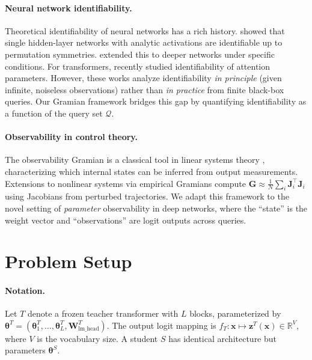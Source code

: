 \documentclass{article}
\newcommand{\R}{\mathbb{R}}
\newcommand{\cQ}{\mathcal{Q}}
\newcommand{\btheta}{\boldsymbol{\theta}}
\newcommand{\bz}{\mathbf{z}}
\newcommand{\bx}{\mathbf{x}}
\newcommand{\bW}{\mathbf{W}}
\newcommand{\bJ}{\mathbf{J}}
\newcommand{\bG}{\mathbf{G}}
\begin{document}
\paragraph{Neural network identifiability.}
Theoretical identifiability of neural networks has a rich history. \citet{sussmann1992uniqueness} showed that single hidden-layer networks with analytic activations are identifiable up to permutation symmetries. \citet{bui2020functional} extended this to deeper networks under specific conditions. For transformers, \citet{liu2025identifiability} recently studied identifiability of attention parameters. However, these works analyze identifiability \emph{in principle} (given infinite, noiseless observations) rather than \emph{in practice} from finite black-box queries. Our Gramian framework bridges this gap by quantifying identifiability as a function of the query set $\cQ$.

\paragraph{Observability in control theory.}
The observability Gramian is a classical tool in linear systems theory \citep{kailath1980linear}, characterizing which internal states can be inferred from output measurements. Extensions to nonlinear systems via empirical Gramians \citep{lall2002subspace} compute $\bG \approx \frac{1}{N}\sum_i \bJ_i^\top \bJ_i$ using Jacobians from perturbed trajectories. We adapt this framework to the novel setting of \emph{parameter} observability in deep networks, where the ``state'' is the weight vector and ``observations'' are logit outputs across queries.


\section{Problem Setup}
\label{sec:setup}

\paragraph{Notation.}
Let $T$ denote a frozen teacher transformer with $L$ blocks, parameterized by $\btheta^T = (\btheta^T_1, \ldots, \btheta^T_L, \bW_{\text{lm\_head}}^T)$. The output logit mapping is $f_T: \bx \mapsto \bz^T(\bx) \in \R^{V}$, where $V$ is the vocabulary size. A student $S$ has identical architecture but parameters $\btheta^S$.
\end{document}
